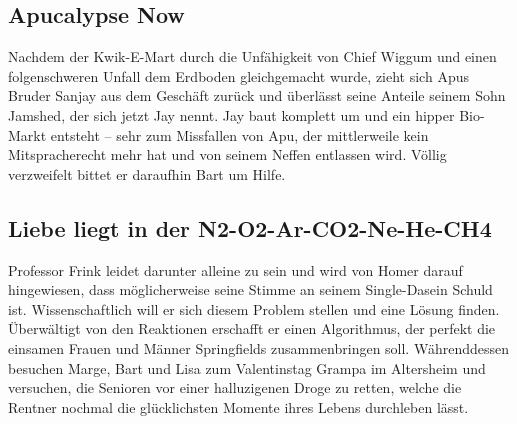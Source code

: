 
\subsection{Apucalypse Now}\label{VABF05}
Nachdem der Kwik-E-Mart durch die Unfähigkeit von Chief Wiggum und einen folgenschweren Unfall dem Erdboden gleichgemacht wurde, zieht sich Apus Bruder Sanjay aus dem Geschäft zurück und überlässt seine Anteile seinem Sohn Jamshed, der sich jetzt Jay nennt. Jay baut komplett um und ein hipper Bio-Markt entsteht -- sehr zum Missfallen von Apu, der mittlerweile kein Mitspracherecht mehr hat und von seinem Neffen entlassen wird. Völlig verzweifelt bittet er daraufhin Bart um Hilfe.


\subsection{Liebe liegt in der N2-O2-Ar-CO2-Ne-He-CH4}\label{VABF07}
Professor Frink leidet darunter alleine zu sein und wird von Homer darauf hingewiesen, dass möglicherweise seine Stimme an seinem Single-Dasein Schuld ist. Wissenschaftlich will er sich diesem Problem stellen und eine Lösung finden. Überwältigt von den Reaktionen erschafft er einen Algorithmus, der perfekt die einsamen Frauen und Männer Springfields zusammenbringen soll. Währenddessen besuchen Marge, Bart und Lisa zum Valentinstag Grampa im Altersheim und versuchen, die Senioren vor einer halluzigenen Droge zu retten, welche die Rentner nochmal die glücklichsten Momente ihres Lebens durchleben lässt.


